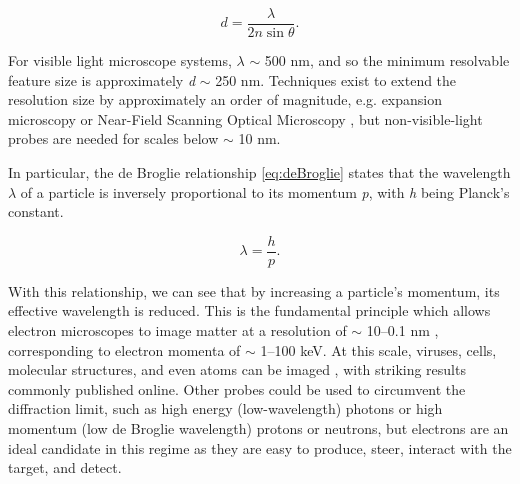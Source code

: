         \begin{equation}\label{eq:diffraction}
            d = \frac{\lambda}{2n\sin{\theta}}.
        \end{equation}
        
        For visible light microscope systems, $\lambda$ $\sim$ 500 nm, and so the minimum resolvable feature size is approximately \textit{d} $\sim$ 250 nm. Techniques exist to extend the resolution size by approximately an order of magnitude, e.g. expansion microscopy \parencite{Chen2015ExpansionMicroscopy} or Near-Field Scanning Optical Microscopy \parencite{Ma20216Source}, but non-visible-light probes are needed for scales below $\sim$ 10 nm. 

        

        In particular, the de Broglie relationship \eqref{eq:deBroglie} \parencite{Broglie1924AQuanta} states that the wavelength $\lambda$ of a particle is inversely proportional to its momentum \textit{p}, with \textit{h} being Planck's constant. 
        
            \begin{equation}\label{eq:deBroglie}
               \lambda = \frac{h}{p}.
            \end{equation}

        With this relationship, we can see that by increasing a particle's momentum, its effective wavelength is reduced. This is the fundamental principle which allows electron microscopes to image matter at a resolution of $\sim$ 10--0.1 nm \parencite{Franken2020ADevelopments}, corresponding to electron momenta of $\sim$ 1--100 keV. At this scale, viruses, cells, molecular structures, and even atoms can be imaged \parencite{Williams2009TransmissionMicroscopy}, with striking results commonly published online. Other probes could be used to circumvent the diffraction limit, such as high energy (low-wavelength) photons or high momentum (low de Broglie wavelength) protons or neutrons, but electrons are an ideal candidate in this regime as they are easy to produce, steer, interact with the target, and detect. 

